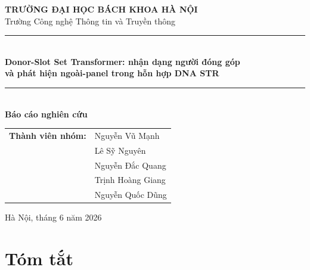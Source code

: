 \documentclass[12pt,a4paper]{article}
\begin{document}
\begin{titlepage}
  \centering
  \vspace*{1.0cm}

  {\large\textbf{TRƯỜNG ĐẠI HỌC BÁCH KHOA HÀ NỘI}}\\[0.25cm]
  {\normalsize Trường Công nghệ Thông tin và Truyền thông}\\[1.6cm]

  \rule{\linewidth}{1.4pt}\\[0.5cm]
  {\LARGE\bfseries Donor-Slot Set Transformer: nhận dạng người đóng góp}\\[0.25cm]
  {\LARGE\bfseries và phát hiện ngoài-panel trong hỗn hợp DNA STR}\\[0.5cm]
  \rule{\linewidth}{1.4pt}\\[1.4cm]

  {\large\textbf{Báo cáo nghiên cứu}}\\[1.3cm]

  \begin{tabular}{>{\bfseries}rl}
    Thành viên nhóm: & Nguyễn Vũ Mạnh \\[0.25cm]
                     & Lê Sỹ Nguyên \\[0.25cm]
                     & Nguyễn Đắc Quang \\[0.25cm]
                     & Trịnh Hoàng Giang \\[0.25cm]
                     & Nguyễn Quốc Dũng
  \end{tabular}

  \vfill
  {\large Hà Nội, tháng 6 năm 2026}
\end{titlepage}

\tableofcontents
\newpage

\section*{Tóm tắt}
\end{document}
